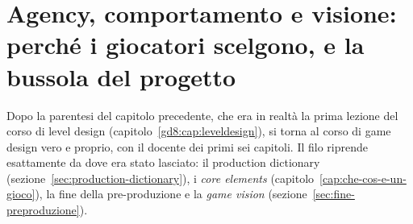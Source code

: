 
\chapter[Agency, comportamento e visione]{Agency, comportamento e visione:
perché i giocatori scelgono, e la bussola del progetto}
\label{gd9:cap:agency-visione}

Dopo la parentesi del capitolo precedente, che era in realtà la prima lezione
del corso di level design (capitolo~\ref{gd8:cap:leveldesign}), si torna al
corso di game design vero e proprio, con il docente dei primi sei capitoli. Il
filo riprende esattamente da dove era stato lasciato: il production dictionary
(sezione~\ref{sec:production-dictionary}), i \emph{core elements}
(capitolo~\ref{cap:che-cos-e-un-gioco}), la fine della pre-produzione e la
\emph{game vision} (sezione~\ref{sec:fine-preproduzione}).

